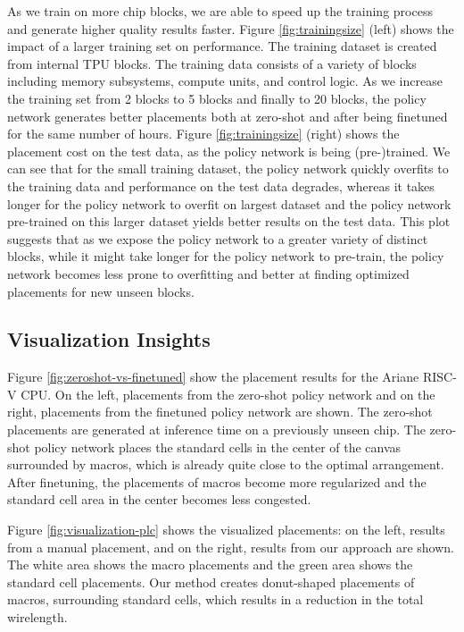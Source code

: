 \documentclass{article}
\begin{document}
As we train on more chip blocks, we are able to speed up the training process and generate higher quality results faster. Figure \ref{fig:trainingsize} (left) shows the impact of a larger training set on performance. The training dataset is created from internal TPU blocks. The training data consists of a variety of blocks including memory subsystems, compute units, and control logic. As we increase the training set from 2 blocks to 5 blocks and finally to 20 blocks, the policy network generates better placements both at zero-shot and after being finetuned for the same number of hours. Figure \ref{fig:trainingsize} (right) shows the placement cost on the test data, as the policy network is being (pre-)trained. We can see that for the small training dataset, the policy network quickly overfits to the training data and performance on the test data degrades, whereas it takes longer for the policy network to overfit on largest dataset and the policy network pre-trained on this larger dataset yields better results on the test data. This plot suggests that as we expose the policy network to a greater variety of distinct blocks, while it might take longer for the policy network to pre-train, the policy network becomes less prone to overfitting and better at finding optimized placements for new unseen blocks. 









\subsection{Visualization Insights} Figure \ref{fig:zeroshot-vs-finetuned} show the placement results for the Ariane RISC-V CPU. On the left, placements from the zero-shot policy network and on the right, placements from the finetuned policy network are shown. The zero-shot placements are generated at inference time on a previously unseen chip. The zero-shot policy network places the standard cells in the center of the canvas surrounded by macros, which is already quite close to the optimal arrangement. After finetuning, the placements of macros become more regularized and the standard cell area in the center becomes less congested.

Figure \ref{fig:visualization-plc} shows the visualized placements: on the left, results from a manual placement, and on the right, results from our approach are shown. The white area shows the macro placements and the green area shows the standard cell placements. Our method creates donut-shaped placements of macros, surrounding standard cells, which results in a reduction in the total wirelength. 
\end{document}
